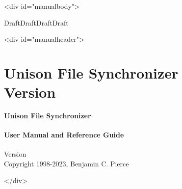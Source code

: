\documentclass{article}
\begin{document}
\ifhevea\begin{rawhtml}<div id="manualbody">\end{rawhtml}\fi

\ifhevea\else\bigskip\fi%
\ifdraft%
\begin{center}%
{\Huge \ifhevea\red\fi DraftDraftDraftDraft}%
\end{center}%
\ifhevea\else \bigskip \fi
\fi

\ifhevea\begin{rawhtml}<div id="manualheader">\end{rawhtml}%
\else \thispagestyle{empty}
\fi%
%
\iftextversion
  \section*{Unison File Synchronizer
  \\
  Version
  \unisonversion
  }
\else%
  \ifhevea\else \vspace*{2in} \fi%
  \begin{center}%
  \Huge{\ifhevea\black\else\bf \fi Unison File  Synchronizer}%
  \ifhevea \\ \else \\[2ex] \fi%
  \huge {\ifhevea\black\else\bf \fi User Manual and Reference Guide}%
  \ifhevea \\ \else \\[6ex] \fi%
  \LARGE%
  Version \unisonversion \\[4ex] %
  \large Copyright 1998-2023, Benjamin C. Pierce
  \end{center}%
\fi%
%
%
\ifhevea\begin{rawhtml}</div>\end{rawhtml}\fi

\ifhevea\else\newpage\fi
\TABLEOFCONTENTS
\ifhevea\else\newpage\fi




\ifhevea\else\bigskip\fi

\end{document}
